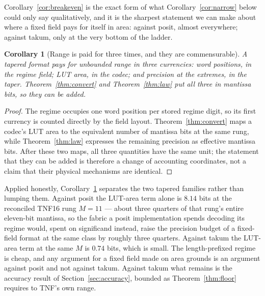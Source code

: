 \documentclass[11pt]{article}
\newtheorem{corollary}{Corollary}
\theoremstyle{definition}
\begin{document}
Corollary~\ref{cor:breakeven} is the exact form of what
Corollary~\ref{cor:narrow} below could only say qualitatively, and it is the sharpest
statement we can make about where a fixed field pays for itself in area: against
posit, almost everywhere; against takum, only at the very bottom of the ladder.

\begin{corollary}[Range is paid for three times, and they are commensurable]
\label{cor:three}
A tapered format pays for unbounded range in three currencies: word positions,
in the regime field; LUT area, in the codec; and precision at the extremes, in the
taper. Theorem~\ref{thm:convert} and Theorem~\ref{thm:law} put all three in
mantissa bits, so they can be added.
\end{corollary}
\begin{proof}
The regime occupies one word position per stored regime digit, so its first currency
is counted directly by the field layout. Theorem~\ref{thm:convert} maps a codec's
LUT area to the equivalent number of mantissa bits at the same rung, while
Theorem~\ref{thm:law} expresses the remaining precision as effective mantissa bits.
After these two maps, all three quantities have the same unit; the statement that
they can be added is therefore a change of accounting coordinates, not a claim that
their physical mechanisms are identical.
\end{proof}

Applied honestly, Corollary~\ref{cor:three} separates the two tapered families
rather than lumping them. Against posit the LUT-area term alone is $8.14$ bits at
the reconciled TNF16 rung $M = 11$ --- about three quarters of that rung's entire
eleven-bit mantissa, so the fabric a posit implementation spends decoding its
regime would, spent on significand instead, raise the precision budget of a
fixed-field format at the same class by roughly three quarters. Against takum the
LUT-area term at the same $M$ is $0.74$ bits, which is small. The
length-prefixed regime is cheap, and any argument for a fixed field made on area
grounds is an argument against posit and not against takum. Against takum what
remains is the accuracy result of Section~\ref{sec:accuracy}, bounded as
Theorem~\ref{thm:floor} requires to TNF's own range.
\end{document}
